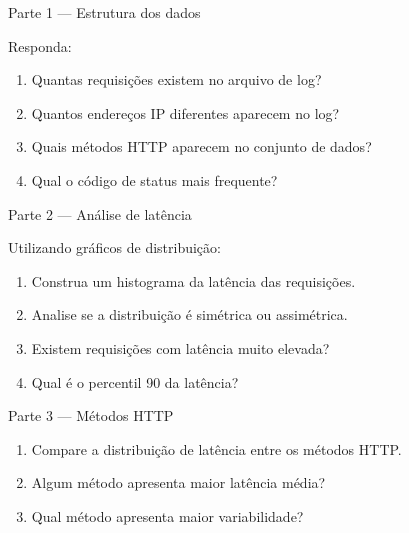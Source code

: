 \documentclass[12pt,a4paper]{report}
\begin{document}
\begin{block}{Parte 1 — Estrutura dos dados}

Responda:

\begin{enumerate}
\item Quantas requisições existem no arquivo de log?
\item Quantos endereços IP diferentes aparecem no log?
\item Quais métodos HTTP aparecem no conjunto de dados?
\item Qual o código de status mais frequente?
\end{enumerate}

\vspace{2cm}

\end{block}

\begin{block}{Parte 2 — Análise de latência}

Utilizando gráficos de distribuição:

\begin{enumerate}
\item Construa um histograma da latência das requisições.
\item Analise se a distribuição é simétrica ou assimétrica.
\item Existem requisições com latência muito elevada?
\item Qual é o percentil 90 da latência?
\end{enumerate}

\vspace{3cm}

\end{block}

\begin{block}{Parte 3 — Métodos HTTP}

\begin{enumerate}
\item Compare a distribuição de latência entre os métodos HTTP.
\item Algum método apresenta maior latência média?
\item Qual método apresenta maior variabilidade?
\end{enumerate}

\vspace{3cm}

\end{block}
\end{document}
